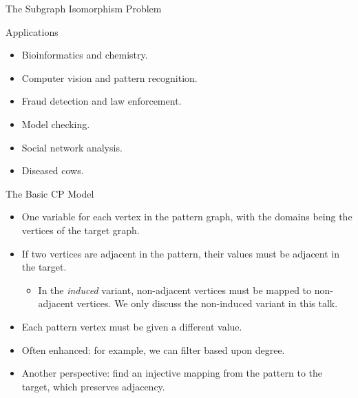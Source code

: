 \documentclass{beamer}
\begin{document}
\begin{frame}{The Subgraph Isomorphism Problem}

\end{frame}

\begin{frame}{Applications}
    \begin{itemize}
        \item Bioinformatics and chemistry.
        \item Computer vision and pattern recognition.
        \item Fraud detection and law enforcement.
        \item Model checking.
        \item Social network analysis.
        \item Diseased cows.
    \end{itemize}
\end{frame}

\begin{frame}{The Basic CP Model}
    \begin{itemize}
        \item One \textcolor{uofgrose}{variable for each vertex in the pattern} graph,
        with the \textcolor{uofgrose}{domains being the vertices of the target} graph.
    \item If two vertices are \textcolor{uofgrose}{adjacent in the pattern}, their
        \textcolor{uofgrose}{values must be adjacent} in the target.
            \begin{itemize}
                \item In the \emph{induced} variant, non-adjacent vertices must be mapped to
                    non-adjacent vertices. We only discuss the non-induced variant in this talk.
            \end{itemize}
        \item Each pattern vertex must be given a \textcolor{uofgrose}{different value}.
        \item Often enhanced: for example, we can filter based upon degree.
        \item Another perspective: find an \textcolor{uofgrose}{injective mapping} from the
            pattern to the target, which \textcolor{uofgrose}{preserves adjacency}.
    \end{itemize}
\end{frame}
\end{document}
